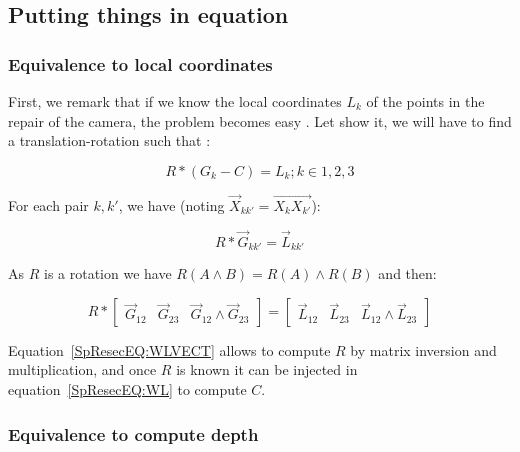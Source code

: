 
\subsection{Putting things in equation}

\subsubsection{Equivalence to local coordinates}

\label{SpRes:EquivLocCoord}

First, we remark that if we know the local coordinates $L_k$ of the points in the repair
of the camera, the problem becomes easy . Let show it, we will have to find a translation-rotation such that  :

\begin{equation}
       R*(G_k-C) = L_k  ; k\in{1,2,3} \label{SpResecEQ:WL}
\end{equation}


For each pair $k,k'$, we have (noting $\Vec{X}_{kk'} = \overrightarrow{X_{k}X_{k'}} $):


\begin{equation}
	R* \Vec{G}_{kk'} =  \Vec{L}_{kk'} \label{SpResecEQ:WLVECT}
\end{equation}

As  $R$ is a rotation we have $R(A \wedge  B) = R(A) \wedge   R(B) $ and then:

\begin{equation}
	R* \begin{bmatrix} \Vec{G}_{12} & \Vec{G}_{23} &  \Vec{G}_{12} \wedge \Vec{G}_{23} \end{bmatrix} 
        =  \begin{bmatrix} \Vec{L}_{12} & \Vec{L}_{23} &  \Vec{L}_{12} \wedge \Vec{L}_{23} \end{bmatrix} 
        \label{SpResecEQ:WLVECT}
\end{equation}

Equation~\ref{SpResecEQ:WLVECT} allows to compute $R$ by matrix inversion and multiplication, and 
once $R$ is known it can be injected in equation~\ref{SpResecEQ:WL} to compute $C$.

\subsubsection{Equivalence to compute depth}

